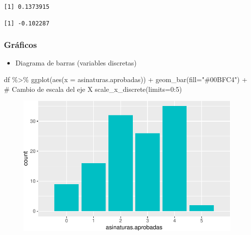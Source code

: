 \documentclass[
  a4paper,
]{scrreport}
\newenvironment{Shaded}{\begin{snugshade}}{\end{snugshade}}
\newcommand{\AttributeTok}[1]{\textcolor[rgb]{0.40,0.45,0.13}{#1}}
\newcommand{\CommentTok}[1]{\textcolor[rgb]{0.37,0.37,0.37}{#1}}
\newcommand{\ConstantTok}[1]{\textcolor[rgb]{0.56,0.35,0.01}{#1}}
\newcommand{\DecValTok}[1]{\textcolor[rgb]{0.68,0.00,0.00}{#1}}
\newcommand{\FunctionTok}[1]{\textcolor[rgb]{0.28,0.35,0.67}{#1}}
\newcommand{\NormalTok}[1]{\textcolor[rgb]{0.00,0.23,0.31}{#1}}
\newcommand{\SpecialCharTok}[1]{\textcolor[rgb]{0.37,0.37,0.37}{#1}}
\newcommand{\StringTok}[1]{\textcolor[rgb]{0.13,0.47,0.30}{#1}}
\providecommand{\tightlist}{%
  \setlength{\itemsep}{0pt}\setlength{\parskip}{0pt}}\usepackage{longtable,booktabs,array}
\theoremstyle{definition}
\theoremstyle{definition}
\theoremstyle{remark}
\begin{document}
\begin{verbatim}
[1] 0.1373915
\end{verbatim}

\begin{Shaded}
\end{Shaded}

\begin{verbatim}
[1] -0.102287
\end{verbatim}

\hypertarget{gruxe1ficos}{%
\subsubsection{Gráficos}\label{gruxe1ficos}}

\begin{itemize}
\tightlist
\item
  Diagrama de barras (variables discretas)
\end{itemize}

\begin{Shaded}
\begin{Highlighting}[]
\NormalTok{df }\SpecialCharTok{\%\textgreater{}\%} \FunctionTok{ggplot}\NormalTok{(}\FunctionTok{aes}\NormalTok{(}\AttributeTok{x =}\NormalTok{ asinaturas.aprobadas)) }\SpecialCharTok{+} 
  \FunctionTok{geom\_bar}\NormalTok{(}\AttributeTok{fill=}\StringTok{"\#00BFC4"}\NormalTok{) }\SpecialCharTok{+} 
  \CommentTok{\# Cambio de escala del eje X}
  \FunctionTok{scale\_x\_discrete}\NormalTok{(}\AttributeTok{limits=}\DecValTok{0}\SpecialCharTok{:}\DecValTok{5}\NormalTok{) }
\end{Highlighting}
\end{Shaded}

\begin{figure}[H]

{\centering \includegraphics{08-analisis-estadisticos_files/figure-pdf/unnamed-chunk-10-1.pdf}

}

\end{figure}
\end{document}
